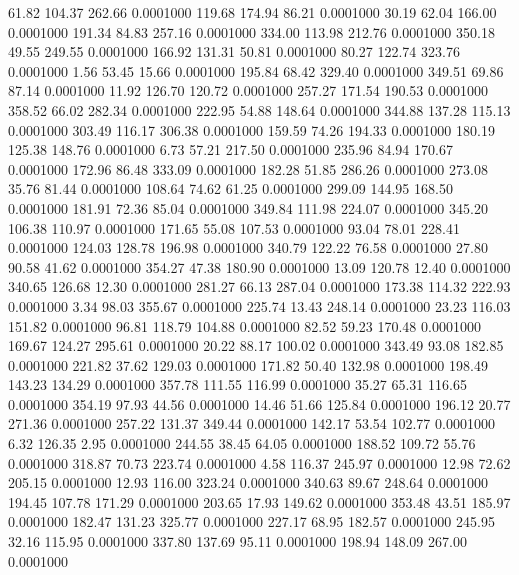   61.82  104.37  262.66   0.0001000
 119.68  174.94   86.21   0.0001000
  30.19   62.04  166.00   0.0001000
 191.34   84.83  257.16   0.0001000
 334.00  113.98  212.76   0.0001000
 350.18   49.55  249.55   0.0001000
 166.92  131.31   50.81   0.0001000
  80.27  122.74  323.76   0.0001000
   1.56   53.45   15.66   0.0001000
 195.84   68.42  329.40   0.0001000
 349.51   69.86   87.14   0.0001000
  11.92  126.70  120.72   0.0001000
 257.27  171.54  190.53   0.0001000
 358.52   66.02  282.34   0.0001000
 222.95   54.88  148.64   0.0001000
 344.88  137.28  115.13   0.0001000
 303.49  116.17  306.38   0.0001000
 159.59   74.26  194.33   0.0001000
 180.19  125.38  148.76   0.0001000
   6.73   57.21  217.50   0.0001000
 235.96   84.94  170.67   0.0001000
 172.96   86.48  333.09   0.0001000
 182.28   51.85  286.26   0.0001000
 273.08   35.76   81.44   0.0001000
 108.64   74.62   61.25   0.0001000
 299.09  144.95  168.50   0.0001000
 181.91   72.36   85.04   0.0001000
 349.84  111.98  224.07   0.0001000
 345.20  106.38  110.97   0.0001000
 171.65   55.08  107.53   0.0001000
  93.04   78.01  228.41   0.0001000
 124.03  128.78  196.98   0.0001000
 340.79  122.22   76.58   0.0001000
  27.80   90.58   41.62   0.0001000
 354.27   47.38  180.90   0.0001000
  13.09  120.78   12.40   0.0001000
 340.65  126.68   12.30   0.0001000
 281.27   66.13  287.04   0.0001000
 173.38  114.32  222.93   0.0001000
   3.34   98.03  355.67   0.0001000
 225.74   13.43  248.14   0.0001000
  23.23  116.03  151.82   0.0001000
  96.81  118.79  104.88   0.0001000
  82.52   59.23  170.48   0.0001000
 169.67  124.27  295.61   0.0001000
  20.22   88.17  100.02   0.0001000
 343.49   93.08  182.85   0.0001000
 221.82   37.62  129.03   0.0001000
 171.82   50.40  132.98   0.0001000
 198.49  143.23  134.29   0.0001000
 357.78  111.55  116.99   0.0001000
  35.27   65.31  116.65   0.0001000
 354.19   97.93   44.56   0.0001000
  14.46   51.66  125.84   0.0001000
 196.12   20.77  271.36   0.0001000
 257.22  131.37  349.44   0.0001000
 142.17   53.54  102.77   0.0001000
   6.32  126.35    2.95   0.0001000
 244.55   38.45   64.05   0.0001000
 188.52  109.72   55.76   0.0001000
 318.87   70.73  223.74   0.0001000
   4.58  116.37  245.97   0.0001000
  12.98   72.62  205.15   0.0001000
  12.93  116.00  323.24   0.0001000
 340.63   89.67  248.64   0.0001000
 194.45  107.78  171.29   0.0001000
 203.65   17.93  149.62   0.0001000
 353.48   43.51  185.97   0.0001000
 182.47  131.23  325.77   0.0001000
 227.17   68.95  182.57   0.0001000
 245.95   32.16  115.95   0.0001000
 337.80  137.69   95.11   0.0001000
 198.94  148.09  267.00   0.0001000
